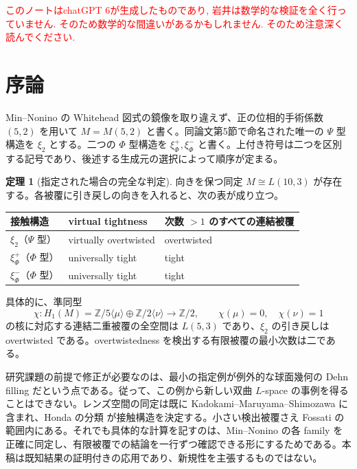 \documentclass[12pt]{amsart}
\theoremstyle{definition}
\theoremstyle{remark}
\numberwithin{equation}{section}
\newcommand{\Z}{\mathbb{Z}}
\newcommand{\xr}[1]{\textcolor{red}{#1}}
\theoremstyle{definition}
\newtheorem{jthm}[thm]{定理}
\begin{document}
\xr{このノートはchatGPT 6が生成したものであり, 岩井は数学的な検証を全く行っていません. そのため数学的な間違いがあるかもしれません. そのため注意深く読んでください.}

\section{序論}\label{ja-intro}
Min--Nonino \cite{ja-MN} の Whitehead 図式の鏡像を取り違えず、正の位相的手術係数 $(5,2)$ を用いて $M=M(5,2)$ と書く。同論文第5節で命名された唯一の $\Psi$ 型構造を $\xi_2$ とする。二つの $\Phi$ 型構造を $\xi_\Phi^+,\xi_\Phi^-$ と書く。上付き符号は二つを区別する記号であり、後述する生成元の選択によって順序が定まる。

\begin{jthm}[指定された場合の完全な判定]\label{ja-main}
向きを保つ同定 $M\cong L(10,3)$ が存在する。各被覆に引き戻しの向きを入れると、次の表が成り立つ。
\begin{center}
\begin{tabular}{lll}\toprule
接触構造 & virtual tightness & 次数 $>1$ のすべての連結被覆\\\midrule
$\xi_2$（$\Psi$ 型） & virtually overtwisted & overtwisted\\
$\xi_\Phi^+$（$\Phi$ 型） & universally tight & tight\\
$\xi_\Phi^-$（$\Phi$ 型） & universally tight & tight\\\bottomrule
\end{tabular}
\end{center}
具体的に、準同型
\begin{equation}\label{ja-character}
\chi:H_1(M)=\Z/5\langle\mu\rangle\oplus\Z/2\langle\nu\rangle\longrightarrow\Z/2,
\qquad\chi(\mu)=0,\quad\chi(\nu)=1
\end{equation}
の核に対応する連結二重被覆の全空間は $L(5,3)$ であり、$\xi_2$ の引き戻しは overtwisted である。overtwistedness を検出する有限被覆の最小次数は二である。
\end{jthm}

研究課題の前提で修正が必要なのは、最小の指定例が例外的な球面幾何の Dehn filling だという点である。従って、この例から新しい双曲 $L$-space の事例を得ることはできない。レンズ空間の同定は既に Kadokami--\allowbreak Maruyama--\allowbreak Shimozawa \cite[Theorem 1.2(B)(5)]{ja-KMS} に含まれ、Honda の分類 \cite{ja-Honda} が接触構造を決定する。小さい検出被覆さえ Fossati \cite[Theorem 5]{ja-Fossati} の範囲内にある。それでも具体的な計算を記すのは、Min--Nonino の各 family を正確に同定し、有限被覆での結論を一行ずつ確認できる形にするためである。本稿は既知結果の証明付きの応用であり、新規性を主張するものではない。
\end{document}
